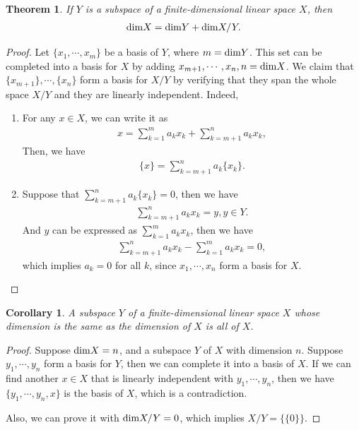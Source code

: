 \documentclass[10pt]{book}
\newtheorem{theorem}{Theorem}[chapter]
\newtheorem{corollary}{Corollary}[theorem]
\theoremstyle{definition}
\numberwithin{equation}{chapter}
\begin{document}
\medskip

\begin{theorem}\label{theorem_quotient_dim}
If $Y$ is a subspace of a finite-dimensional linear space $X$, then
\begin{align*}
    {\rm dim}X = {\rm dim}Y + {\rm dim}X/Y.
\end{align*}
\end{theorem}
\begin{proof}
Let $\{x_1, \cdots, x_m\}$ be a basis of $Y$, where $m = {\rm dim}Y$. This set can be completed into a basis for $X$ by adding $x_{m+1}, \cdots, x_n, n = {\rm dim}X$. We claim that $\{x_{m+1}\}, \cdots, \{x_n\}$ form a basis for $X/Y$ by  verifying that they span the whole space $X/Y$ and they are linearly independent. Indeed,
\begin{enumerate}[label=(\alph*)]
    \item For any $x\in X$, we can write it as 
    \begin{align*}
        x = \sum^m_{k=1}a_k x_k + \sum^{n}_{k=m+1}a_k x_k,
    \end{align*}
    Then, we have 
    \begin{align*}
        \{x\} = \sum^{n}_{k=m+1}a_k \{x_k\}.
    \end{align*}
    \item Suppose that $\sum^{n}_{k=m+1}a_k \{x_k\} = 0$, then we have 
    \begin{align*}
        \sum^{n}_{k=m+1}a_k x_k = y, y\in Y.
    \end{align*}
    And $y$ can be expressed as $\sum^{m}_{k=1}a_k x_k$, then we have 
    \begin{align*}
        \sum^{n}_{k=m+1}a_k x_k - \sum^{m}_{k=1}a_k x_k = 0,
    \end{align*}
    which implies $a_k = 0$ for all $k$, since $x_1, \cdots, x_n$ form a basis for $X$.
\end{enumerate}
\end{proof}


\begin{corollary}
A subspace $Y$ of a finite-dimensional linear space $X$ whose dimension is the same as the dimension of $X$ is all of $X$.
\end{corollary}
\begin{proof}
Suppose ${\rm dim}X = n$, and a subspace $Y$ of $X$ with dimension $n$. Suppose $y_1,\cdots,y_n$ form a basis for $Y$, then we can complete it into a basis of $X$. If we can find another $x\in X$ that is linearly independent with $y_1,\cdots,y_n$, then we have $\{y_1,\cdots,y_n, x\}$ is the basis of $X$, which is a contradiction. 

Also, we can prove it with ${\rm dim}X/Y = 0$, which implies $X/Y = \{\{0\}\}$.
\end{proof}
\end{document}
